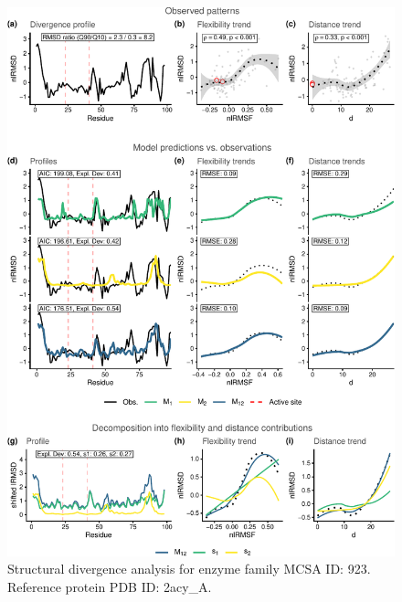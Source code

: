 \documentclass[
]{article}
\begin{document}
\clearpage
\begin{figure}[H]
\centering


\begin{center}\includegraphics{supplementary_material_files/figure-latex/generate_figures-33} \end{center}

\caption{Structural divergence analysis for enzyme family MCSA ID: 923. Reference protein PDB ID: 2acy\_A.}
\end{figure}
\end{document}
